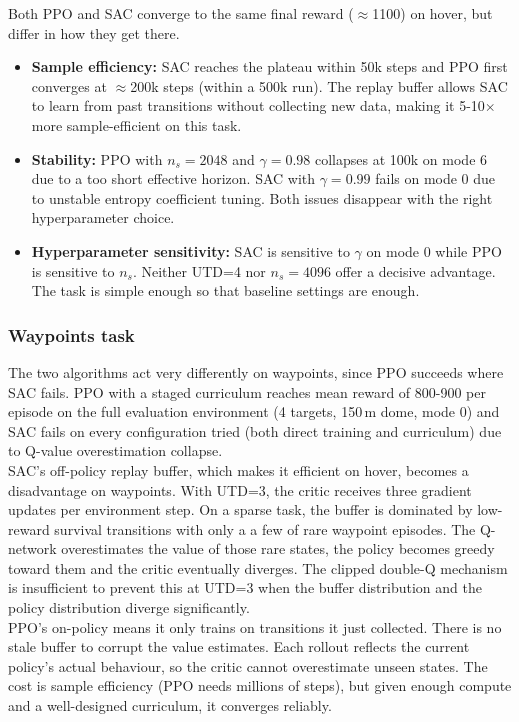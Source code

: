 \documentclass[11pt,a4paper]{article}
\begin{document}
Both PPO and SAC converge to the same final reward ($\approx$1100) on hover, but differ in how they get there.

\begin{itemize}
  \item \textbf{Sample efficiency:} SAC reaches the plateau within 50k steps and PPO first converges at $\approx$200k steps (within a 500k run). The replay buffer allows SAC to learn from past transitions without collecting new data, making it 5-10$\times$ more sample-efficient on this task.
  \item \textbf{Stability:} PPO with $n_s=2048$ and $\gamma=0.98$ collapses at 100k on mode 6 due to a too short effective horizon. SAC with $\gamma=0.99$ fails on mode 0 due to unstable entropy coefficient tuning. Both issues disappear with the right hyperparameter choice.
  \item \textbf{Hyperparameter sensitivity:} SAC is sensitive to $\gamma$ on mode 0 while PPO is sensitive to $n_s$. Neither UTD=4 nor $n_s=4096$ offer a decisive advantage. The task is simple enough so that baseline settings are enough.
\end{itemize}

\subsubsection{Waypoints task}

The two algorithms act very differently on waypoints, since PPO succeeds where SAC fails. PPO with a staged curriculum reaches mean reward of 800-900 per episode on the full evaluation environment (4 targets, 150\,m dome, mode 0) and SAC fails on every configuration tried (both direct training and curriculum) due to Q-value overestimation collapse. \\

SAC's off-policy replay buffer, which makes it efficient on hover, becomes a disadvantage on waypoints. With UTD=3, the critic receives three gradient updates per environment step. On a sparse task, the buffer is dominated by low-reward survival transitions with only a a few of rare waypoint episodes. The Q-network overestimates the value of those rare states, the policy becomes greedy toward them and the critic eventually diverges. The clipped double-Q mechanism is insufficient to prevent this at UTD=3 when the buffer distribution and the policy distribution diverge significantly. \\

PPO's on-policy means it only trains on transitions it just collected. There is no stale buffer to corrupt the value estimates. Each rollout reflects the current policy's actual behaviour, so the critic cannot overestimate unseen states. The cost is sample efficiency (PPO needs millions of steps), but given enough compute and a well-designed curriculum, it converges reliably. \\
\end{document}

